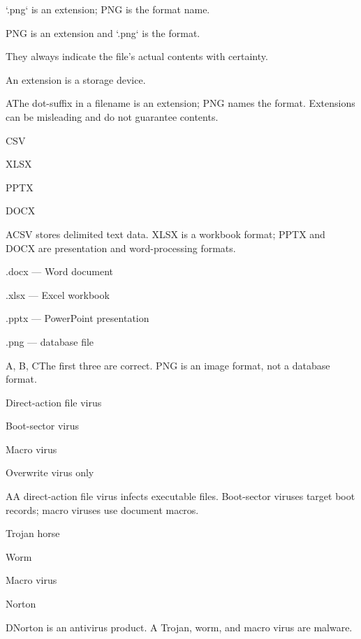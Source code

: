 \begin{enumerate}[label=\textbf{Q\arabic*.}, leftmargin=*]
  {\item `.png` is an extension; PNG is the format name.
   \item PNG is an extension and `.png` is the format.
   \item They always indicate the file's actual contents with certainty.
   \item An extension is a storage device.}
  {A}{The dot-suffix in a filename is an extension; PNG names the format. Extensions can be misleading and do not guarantee contents.}
  {\item CSV
   \item XLSX
   \item PPTX
   \item DOCX}
  {A}{CSV stores delimited text data. XLSX is a workbook format; PPTX and DOCX are presentation and word-processing formats.}
  {\item .docx --- Word document
   \item .xlsx --- Excel workbook
   \item .pptx --- PowerPoint presentation
   \item .png --- database file}
  {A, B, C}{The first three are correct. PNG is an image format, not a database format.}
\fi
\ifnum{}
  {\item Direct-action file virus
   \item Boot-sector virus
   \item Macro virus
   \item Overwrite virus only}
  {A}{A direct-action file virus infects executable files. Boot-sector viruses target boot records; macro viruses use document macros.}
  {\item Trojan horse
   \item Worm
   \item Macro virus
   \item Norton}
  {D}{Norton is an antivirus product. A Trojan, worm, and macro virus are malware.}

\end{enumerate}
